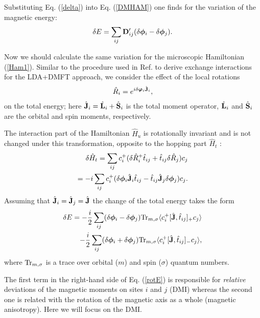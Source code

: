 \documentclass[aps,prl,twocolumn,showpacs,amsmath,amssymb]{revtex4-1}
\begin{document}
Substituting Eq. (\ref{delta}) into Eq. (\ref{DMHAM}) one finds for
the variation of the magnetic energy:
\begin{eqnarray}
\delta E = \sum_{ij} {\bf D}^{\prime}_{ij} (\delta \boldsymbol{\phi}_{i} - \delta
\boldsymbol{\phi}_{j} ). \label{deltaE}
\end{eqnarray}

Now we should calculate the same variation for the microscopic
Hamiltonian (\ref{Ham1}). Similar to the procedure used in Ref.
\cite{katsnelson-epj} to derive exchange interactions for
the LDA+DMFT approach, we consider the effect of the local rotations
\begin{eqnarray}
\hat R_{i} = e^{i\delta \boldsymbol{\varphi}_{i} \hat {\bf J}_{i}},
\end{eqnarray}
on the total energy; here $\hat {\bf J}_{i} = \hat {\bf L}_{i} + \hat
{\bf S}_{i}$ is the total moment operator, $\hat {\bf L}_{i}$ and $\hat
{\bf S}_{i}$ are the orbital and spin moments, respectively.

The interaction part of the Hamiltonian $\hat{H}_{u}$ is
rotationally invariant and is not changed under this
transformation, opposite to the hopping part $\hat H_{t}$ :
\begin{eqnarray}
\delta \hat H_{t} = \sum_{ij} c^{+}_{i} ( \delta \hat R^{+}_{i} \hat t_{ij} + \hat t_{ij} \delta \hat R_{j} ) c_{j} \nonumber \\
= -i \sum_{ij} c^{+}_{i} ( \delta \boldsymbol{\phi}_{i} \hat {\bf J}_{i} \hat t_{ij} - \hat t_{ij} \hat {\bf J}_{j} \delta \boldsymbol{\phi}_{j} ) c_{j}.
\label{rotH}
\end{eqnarray}
Assuming that $\hat {\bf J}_{i} = \hat {\bf J}_{j} = \hat {\bf J}$ the change of the total energy takes the form
\begin{eqnarray}
\delta E = -\frac{i}{2} \sum_{ij}(\delta \boldsymbol{\phi}_{i} -
\delta \boldsymbol{\phi}_{j}) {\rm Tr}_{m, \sigma} \langle c^{+}_i [\hat
{\bf J} , \hat t_{ij}]_{+} c_{j} \rangle \nonumber \\
-\frac{i}{2} \sum_{ij}(\delta \boldsymbol{\phi}_{i} +
\delta \boldsymbol{\phi}_{j}) {\rm Tr}_{m, \sigma} \langle c^{+}_i [\hat
{\bf J} , \hat t_{ij}]_{-} c_{j} \rangle,
\label{rotE}
\end{eqnarray}
where ${\rm Tr}_{m, \sigma}$ is a trace over orbital ($m$) and spin
($\sigma$) quantum numbers.

The first term in the right-hand side of Eq. (\ref{rotE}) is
responsible for {\it relative} deviations of the magnetic moments
on sites $i$ and $j$ (DMI) whereas the second one is related with
the rotation of the magnetic axis as a whole (magnetic
anisotropy). Here we will focus on the DMI.
\end{document}
